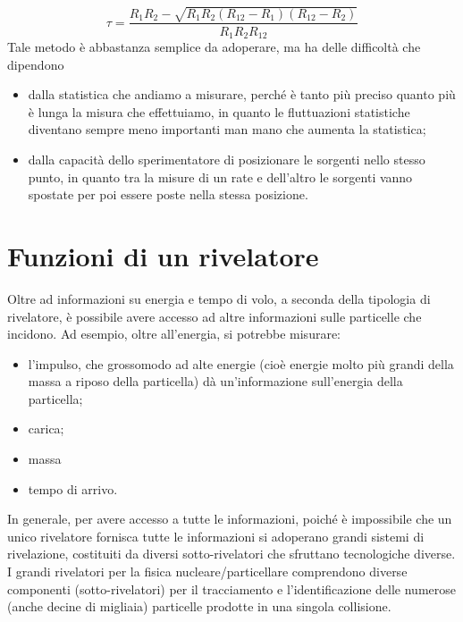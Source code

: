 \begin{esempio}
   \begin{equation*}
      \tau=\frac{R_1R_2 - \sqrt{R_1R_2( R_{12} - R_1 )( R_{12} - R_2 )}}{R_1R_2R_{12}}
   \end{equation*}
   Tale metodo è abbastanza semplice da adoperare, ma ha delle difficoltà che dipendono
   \begin{itemize}[leftmargin=0.5cm]
      \item dalla statistica che andiamo a misurare, perché è tanto più preciso quanto più è lunga la misura che effettuiamo, in quanto le fluttuazioni statistiche diventano sempre meno importanti man mano che aumenta la statistica;
      \item dalla capacità dello sperimentatore di posizionare le sorgenti nello stesso punto, in quanto tra la misure di un rate e dell'altro le sorgenti vanno spostate per poi essere poste nella stessa posizione.
   \end{itemize}
\end{esempio}

\section{Funzioni di un rivelatore}

Oltre ad informazioni su energia e tempo di volo, a seconda della tipologia di rivelatore, è possibile avere accesso ad altre informazioni sulle particelle che incidono. Ad esempio, oltre all'energia, si potrebbe misurare:

\begin{itemize}
   \item l'impulso, che grossomodo ad alte energie (cioè energie molto più grandi della massa a riposo della particella) dà un'informazione sull'energia della particella;
   \item carica;
   \item massa
   \item tempo di arrivo.
\end{itemize}

In generale, per avere accesso a tutte le informazioni, poiché è impossibile che un unico rivelatore fornisca tutte le informazioni si adoperano grandi sistemi di rivelazione, costituiti da diversi sotto-rivelatori che sfruttano tecnologiche diverse. I grandi rivelatori per la fisica nucleare/particellare comprendono diverse componenti (sotto-rivelatori) per il tracciamento e l'identificazione delle numerose (anche decine di migliaia) particelle prodotte in una singola collisione.

